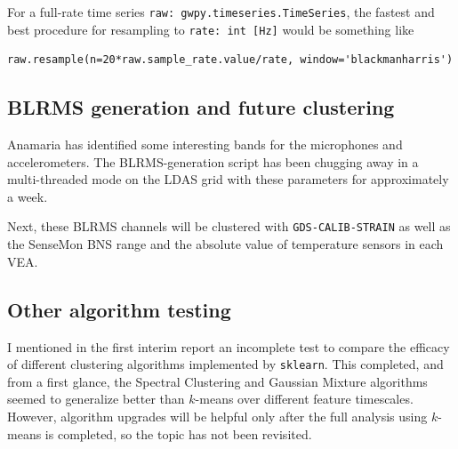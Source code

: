 \documentclass[colorlinks=true,pdfstartview=FitV,linkcolor=blue,
            citecolor=red,urlcolor=magenta]{ligodoc}
\begin{document}
For a full-rate time series \texttt{raw: gwpy.timeseries.TimeSeries}, the fastest and best procedure for resampling to \texttt{rate: int [Hz]} would be something like
\begin{verbatim}
raw.resample(n=20*raw.sample_rate.value/rate, window='blackmanharris')
\end{verbatim}

\subsection{BLRMS generation and future clustering}
Anamaria has identified some interesting bands for the microphones and accelerometers.
The BLRMS-generation script has been chugging away in a multi-threaded mode on the LDAS grid with these parameters for approximately a week.

Next, these BLRMS channels will be clustered with \texttt{GDS-CALIB-STRAIN} as well as the SenseMon BNS range and the absolute value of temperature sensors in each VEA. 

\subsection{Other algorithm testing}
I mentioned in the first interim report an incomplete test to compare the efficacy of different clustering algorithms implemented by \texttt{sklearn}.
This completed, and from a first glance, the Spectral Clustering and Gaussian Mixture algorithms seemed to generalize better than $k$-means over different feature timescales.
However, algorithm upgrades will be helpful only after the full analysis using $k$-means is completed, so the topic has not been revisited.


\end{document}
